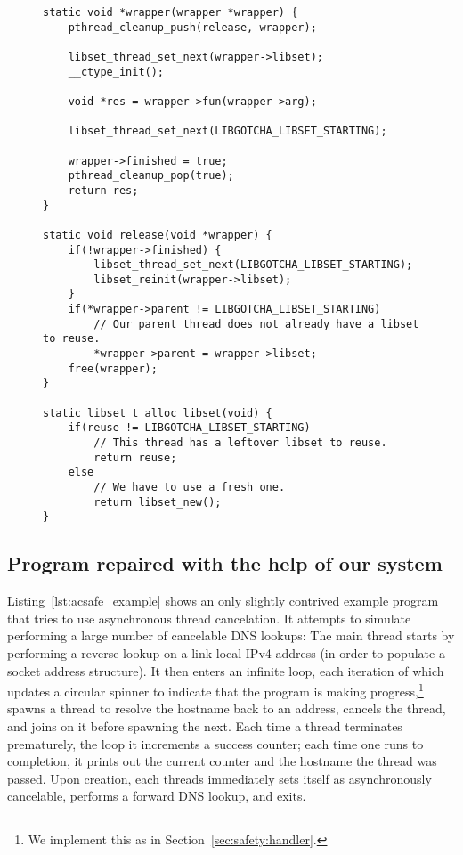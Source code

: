 \begin{figure}
\begin{lstlisting}[label=lst:acsafe_helpers,caption=\textit{libac-safe}'s thread initializer and cleanup handler]
static void *wrapper(wrapper *wrapper) {
	pthread_cleanup_push(release, wrapper);

	libset_thread_set_next(wrapper->libset);
	__ctype_init();

	void *res = wrapper->fun(wrapper->arg);

	libset_thread_set_next(LIBGOTCHA_LIBSET_STARTING);

	wrapper->finished = true;
	pthread_cleanup_pop(true);
	return res;
}

static void release(void *wrapper) {
	if(!wrapper->finished) {
		libset_thread_set_next(LIBGOTCHA_LIBSET_STARTING);
		libset_reinit(wrapper->libset);
	}
	if(*wrapper->parent != LIBGOTCHA_LIBSET_STARTING)
		// Our parent thread does not already have a libset to reuse.
		*wrapper->parent = wrapper->libset;
	free(wrapper);
}

static libset_t alloc_libset(void) {
	if(reuse != LIBGOTCHA_LIBSET_STARTING)
		// This thread has a leftover libset to reuse.
		return reuse;
	else
		// We have to use a fresh one.
		return libset_new();
}
\end{lstlisting}
\end{figure}


\subsection{Program repaired with the help of our system}
\label{sec:safety:thread}

Listing~\ref{lst:acsafe_example} shows an only slightly contrived example program
that tries to use asynchronous thread cancelation.  It attempts to simulate
performing a large number of cancelable DNS lookups:  The main thread starts by
performing a reverse lookup on a link-local IPv4 address (in order to populate a
socket address structure).  It then enters an infinite loop, each iteration of which
updates a circular spinner to indicate that the program is making
progress,\footnote{We implement this as in Section~\ref{sec:safety:handler}.} spawns
a thread to resolve the hostname back to an address, cancels the thread, and joins on
it before spawning the next.  Each time a thread terminates prematurely, the loop it
increments a success counter; each time one runs to completion, it prints out the
current counter and the hostname the thread was passed.  Upon creation, each threads
immediately sets itself as asynchronously cancelable, performs a forward DNS lookup,
and exits.


